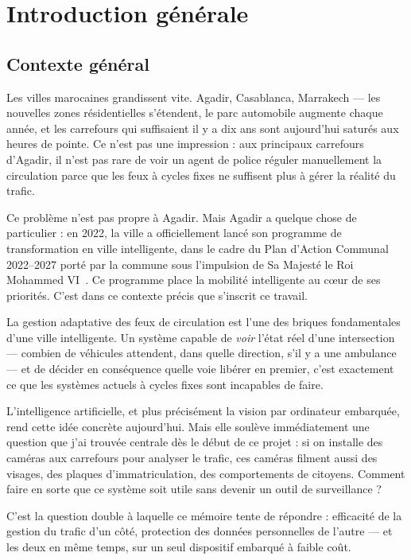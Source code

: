 \chapter{Introduction générale}
\label{ch:introduction}

\section{Contexte général}

Les villes marocaines grandissent vite. Agadir,
Casablanca, Marrakech — les nouvelles zones
résidentielles s'étendent, le parc automobile
augmente chaque année, et les carrefours qui
suffisaient il y a dix ans sont aujourd'hui
saturés aux heures de pointe. Ce n'est pas
une impression : aux principaux carrefours
d'Agadir, il n'est pas rare de voir un agent
de police réguler manuellement la circulation
parce que les feux à cycles fixes ne suffisent
plus à gérer la réalité du trafic.

Ce problème n'est pas propre à Agadir. Mais
Agadir a quelque chose de particulier : en 2022,
la ville a officiellement lancé son programme
de transformation en ville intelligente, dans
le cadre du Plan d'Action Communal 2022--2027
porté par la commune sous l'impulsion de Sa
Majesté le Roi Mohammed VI~\cite{elalaoui2025}.
Ce programme place la mobilité intelligente
au cœur de ses priorités. C'est dans ce
contexte précis que s'inscrit ce travail.

La gestion adaptative des feux de circulation
est l'une des briques fondamentales d'une
ville intelligente. Un système capable de
\textit{voir} l'état réel d'une intersection
— combien de véhicules attendent, dans quelle
direction, s'il y a une ambulance — et de
décider en conséquence quelle voie libérer
en premier, c'est exactement ce que les
systèmes actuels à cycles fixes sont incapables
de faire.

L'intelligence artificielle, et plus précisément
la vision par ordinateur embarquée, rend
cette idée concrète aujourd'hui. Mais elle
soulève immédiatement une question que j'ai
trouvée centrale dès le début de ce projet :
si on installe des caméras aux carrefours
pour analyser le trafic, ces caméras filment
aussi des visages, des plaques d'immatriculation,
des comportements de citoyens. Comment faire
en sorte que ce système soit utile sans
devenir un outil de surveillance ?

C'est la question double à laquelle ce mémoire
tente de répondre : efficacité de la gestion
du trafic d'un côté, protection des données
personnelles de l'autre — et les deux en
même temps, sur un seul dispositif embarqué
à faible coût.

